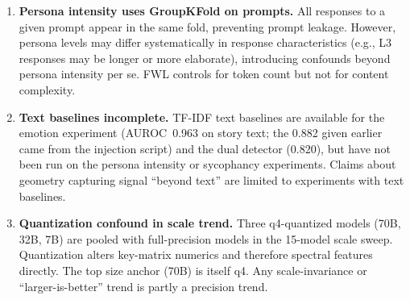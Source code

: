 \documentclass[11pt,a4paper]{article}
\begin{document}
\begin{enumerate}

    \item \textbf{Persona intensity uses GroupKFold on prompts.} All
    responses to a given prompt appear in the same fold, preventing prompt
    leakage. However, persona levels may differ systematically in response
    characteristics (e.g., L3 responses may be longer or more elaborate),
    introducing confounds beyond persona intensity per se. FWL controls
    for token count but not for content complexity.


    \item \textbf{Text baselines incomplete.} TF-IDF text baselines are
    available for the emotion experiment (AUROC~0.963 on story text; the
    0.882 given earlier came from the injection script) and the dual
    detector (0.820), but have not been run on the persona intensity or
    sycophancy experiments. Claims about geometry capturing signal
    ``beyond text'' are limited to experiments with text baselines.



    \item \textbf{Quantization confound in scale trend.} Three
    q4-quantized models (70B, 32B, 7B) are pooled with full-precision
    models in the 15-model scale sweep. Quantization alters key-matrix
    numerics and therefore spectral features directly. The top size
    anchor (70B) is itself q4. Any scale-invariance or
    ``larger-is-better'' trend is partly a precision trend.


\end{enumerate}
\end{document}
